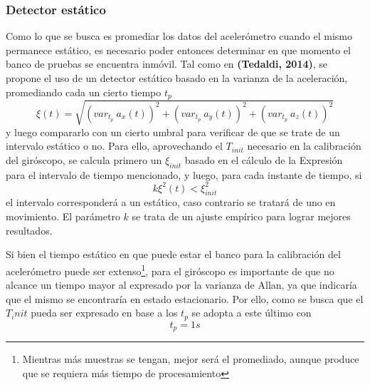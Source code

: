 \subsubsection{Detector estático}
Como lo que se busca es promediar los datos del acelerómetro cuando el mismo permanece estático, es necesario poder entonces determinar en que momento el banco de pruebas se encuentra inmóvil. Tal como en \textbf{(Tedaldi, 2014)}, se propone el uso de un detector estático basado en la varianza de la aceleración, promediando cada un cierto tiempo $t_p$
\begin{equation}
    \xi(t) = \sqrt{(var_{t_p}\ a_x(t))^2 + (var_{t_p}\ a_y(t))^2 + (var_{t_p}\ a_z(t))^2}
\end{equation}
y luego compararlo con un cierto umbral para verificar de que se trate de un intervalo estático o no. Para ello, aprovechando el $T_{init}$ necesario en la calibración del giróscopo, se calcula primero un $\xi_{init}$ basado en el cálculo de la Expresión para el intervalo de tiempo mencionado, y luego, para cada instante de tiempo, si
\begin{equation}
     k\xi^2(t) < \xi^2_{init}
\end{equation}
el intervalo corresponderá a un estático, caso contrario se tratará de uno en movimiento. El parámetro $k$ se trata de un ajuste empírico para lograr mejores resultados.

Si bien el tiempo estático en que puede estar el banco para la calibración del acelerómetro puede ser extenso\footnote{Mientras más muestras se tengan, mejor será el promediado, aunque produce que se requiera más tiempo de procesamiento}, para el giróscopo es importante de que no alcance un tiempo mayor al expresado por la varianza de Allan, ya que indicaría que el mismo se encontraría en estado estacionario. Por ello, como se busca que el $T_init$ pueda ser expresado en base a los $t_p$ se adopta a este último con
\begin{equation}
    t_p = 1 s
\end{equation}

